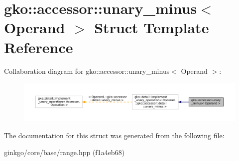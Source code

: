 \hypertarget{structgko_1_1accessor_1_1unary__minus}{}\section{gko\+:\+:accessor\+:\+:unary\+\_\+minus$<$ Operand $>$ Struct Template Reference}
\label{structgko_1_1accessor_1_1unary__minus}


Collaboration diagram for gko\+:\+:accessor\+:\+:unary\+\_\+minus$<$ Operand $>$\+:
\nopagebreak
\begin{figure}[H]
\begin{center}
\leavevmode
\includegraphics[width=350pt]{structgko_1_1accessor_1_1unary__minus__coll__graph}
\end{center}
\end{figure}


The documentation for this struct was generated from the following file\+:\begin{DoxyCompactItemize}
\item 
ginkgo/core/base/range.\+hpp (f1a4eb68)\end{DoxyCompactItemize}
